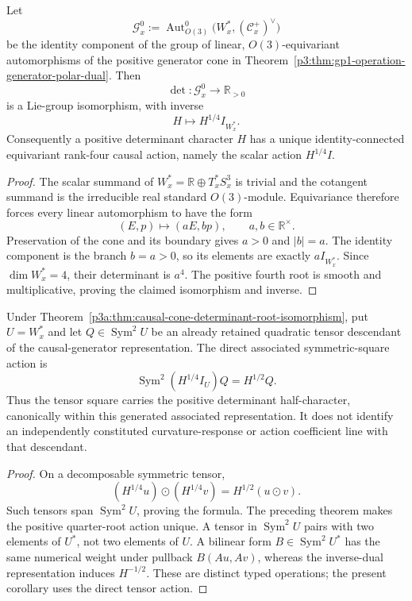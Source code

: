 \documentclass[12pt,a4paper]{article}
\begin{document}
\begin{theorem}
\label{p3a:thm:causal-cone-determinant-root-isomorphism}
Let
\[
 \mathcal G_x^0
 :=\operatorname{Aut}_{O(3)}^0
       \bigl(W_x^*,(\mathcal C_x^+)^\vee\bigr)
\]
be the identity component of the group of linear, \(O(3)\)-equivariant
automorphisms of the positive generator cone in
Theorem~\ref{p3:thm:gp1-operation-generator-polar-dual}.  Then
\[
 \det:\mathcal G_x^0\longrightarrow\mathbb R_{>0}
\]
is a Lie-group isomorphism, with inverse
\[
 H\longmapsto H^{1/4}I_{W_x^*}.
\]
Consequently a positive determinant character \(H\) has a unique
identity-connected equivariant rank-four causal action, namely the scalar
action \(H^{1/4}I\).
\end{theorem}

\begin{proof}
The scalar summand of \(W_x^*=\mathbb R\oplus T_x^*S_x^3\) is trivial and
the cotangent summand is the irreducible real standard \(O(3)\)-module.
Equivariance therefore forces every linear automorphism to have the form
\[
             (E,p)\longmapsto(aE,bp),
             \qquad a,b\in\mathbb R^\times.
\]
Preservation of the cone and its boundary gives \(a>0\) and \(|b|=a\).
The identity component is the branch \(b=a>0\), so its elements are exactly
\(aI_{W_x^*}\).  Since \(\dim W_x^*=4\), their determinant is \(a^4\).
The positive fourth root is smooth and multiplicative, proving the claimed
isomorphism and inverse.
\end{proof}

\begin{corollary}
\label{p3a:cor:causal-root-quadratic-half-character}
Under Theorem~\ref{p3a:thm:causal-cone-determinant-root-isomorphism}, put
\(U=W_x^*\) and let \(Q\in\operatorname{Sym}^2U\) be an already
retained quadratic tensor descendant of the causal-generator representation.
The direct associated symmetric-square action is
\[
 \boxed{\operatorname{Sym}^2(H^{1/4}I_U)Q=H^{1/2}Q.}
\]
Thus the tensor square carries the positive determinant half-character,
canonically within this generated associated representation. It does not
identify an independently constituted curvature-response or action
coefficient line with that descendant.
\end{corollary}
\begin{proof}
On a decomposable symmetric tensor,
\[
 (H^{1/4}u)\odot(H^{1/4}v)=H^{1/2}(u\odot v).
\]
Such tensors span \(\operatorname{Sym}^2U\), proving the formula.
The preceding theorem makes the positive quarter-root action unique.
A tensor in \(\operatorname{Sym}^2U\) pairs with two elements of
\(U^*\), not two elements of \(U\). A bilinear form
\(B\in\operatorname{Sym}^2U^*\) has the same numerical weight under
pullback \(B(Au,Av)\), whereas the inverse-dual representation induces
\(H^{-1/2}\). These are distinct typed operations; the present corollary
uses the direct tensor action.
\end{proof}
\end{document}
